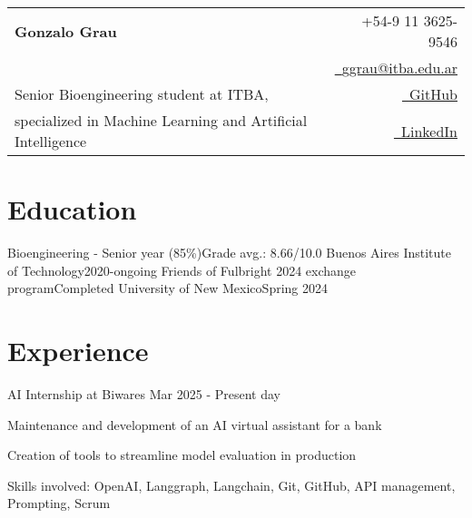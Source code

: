 \documentclass{resume}
\makeatletter
\newcommand{\name}{Gonzalo Grau} %
\renewcommand{\phone}{9 11 3625-9546} %
\newcommand{\emaila}{ggrau@itba.edu.ar} %
\makeatother
\begin{document}
    \selectfont

    {
        \begin{tabularx}{\linewidth}{L r}
            \\
            \textbf{\Huge \name} & {\raisebox{0.0\height}{\footnotesize \faPhone}\ +54-\phone}\\
            & \href{mailto:\emaila}{\raisebox{0.0\height}{\footnotesize \faEnvelope}\ {\emaila}} \\
            Senior Bioengineering student at ITBA, &
            \href{https://github.com/gonzagrau}{\raisebox{0.0\height}{\footnotesize \faGithub}\ {GitHub}} \\
            specialized in Machine Learning and Artificial Intelligence &
            \href{https://www.linkedin.com/in/gonzalo-grau/}
            {\raisebox{0.0\height}{\footnotesize \faLinkedin}\ {LinkedIn}}
        \end{tabularx}
    }




    \section{\textbf{Education}} \label{sec:education}
    \resumeSubHeadingListStart
    \resumeSubheading
    {Bioengineering - Senior year (85\%)}{Grade avg.: 8.66/10.0}
    {Buenos Aires Institute of Technology}{2020-ongoing}
    \resumeSubheading
    {Friends of Fulbright 2024 exchange program}{Completed}
    {University of New Mexico}{Spring 2024}
    \resumeSubHeadingListEnd

    \vspace{-5mm}


    \section{\textbf{Experience}} \label{sec:experience}
    \resumeSubHeadingListStart

    \resumeSubheading
    {AI Internship at Biwares}
    {}{}{Mar 2025 - Present day}
    \vspace{-5mm}
    \resumeItemListStart
    \item
    {Maintenance and development of an AI virtual assistant for a bank}
    \item {Creation of tools to streamline model evaluation in production}
    \item {Skills involved: OpenAI, Langgraph, Langchain, Git, GitHub, API management, Prompting, Scrum}
    \resumeItemListEnd
\end{document}
